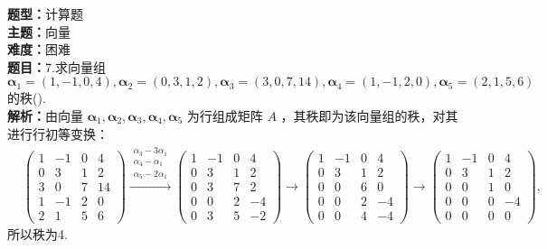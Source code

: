 \documentclass{ctexart}
\newenvironment{question}[5]{%
	\noindent\textbf{题型：}#1\\
	\textbf{主题：}#2\\
	\textbf{难度：}#3\\
	\textbf{题目：}#4\\
	\textbf{解析：}#5\\
	\vspace{1em}
}{}
\begin{document}
	
	\begin{question}
		{计算题}
		{向量}
		{困难}
		{7.求向量组 \(\boldsymbol{\alpha}_1=(1,-1,0,4), \boldsymbol{\alpha}_2=(0,3,1,2), \boldsymbol{\alpha}_3=(3,0,7,14), \boldsymbol{\alpha}_4=(1,-1,2,0), \boldsymbol{\alpha}_5=(2,1,5,6)\) 的秩().}
		{由向量 \(\boldsymbol{\alpha}_1, \boldsymbol{\alpha}_2, \boldsymbol{\alpha}_3, \boldsymbol{\alpha}_4, \boldsymbol{\alpha}_5\) 为行组成矩阵 \(A\) ，其秩即为该向量组的秩，对其进行行初等变换：
			\[
			\begin{aligned}
				&\left(\begin{array}{cccc}
					1 & -1 & 0 & 4 \\
					0 & 3 & 1 & 2 \\
					3 & 0 & 7 & 14 \\
					1 & -1 & 2 & 0 \\
					2 & 1 & 5 & 6
				\end{array}\right) \xrightarrow{\substack{\alpha_3 - 3\alpha_1\\ \alpha_4 - \alpha_1\\ \alpha_5 - 2\alpha_1}} \left(\begin{array}{cccc}
					1 & -1 & 0 & 4 \\
					0 & 3 & 1 & 2 \\
					0 & 3 & 7 & 2 \\
					0 & 0 & 2 & -4 \\
					0 & 3 & 5 & -2
				\end{array}\right) \rightarrow \left(\begin{array}{cccc}
					1 & -1 & 0 & 4 \\
					0 & 3 & 1 & 2 \\
					0 & 0 & 6 & 0 \\
					0 & 0 & 2 & -4 \\
					0 & 0 & 4 & -4
				\end{array}\right) \rightarrow \left(\begin{array}{cccc}
					1 & -1 & 0 & 4 \\
					0 & 3 & 1 & 2 \\
					0 & 0 & 1 & 0 \\
					0 & 0 & 0 & -4 \\
					0 & 0 & 0 & 0
				\end{array}\right),
			\end{aligned}
			\]
			所以秩为4. }
	\end{question}
	
\end{document}
